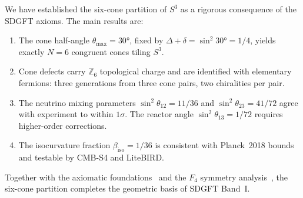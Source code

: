 \documentclass[amsmath,amssymb,aps,prd,twocolumn,superscriptaddress,nofootinbib]{revtex4-2}
\begin{document}
We have established the six-cone partition of $S^3$ as a rigorous consequence
of the SDGFT axioms.  The main results are:

\begin{enumerate}
  \item The cone half-angle $\theta_{\max} = 30°$, fixed by
    $\Delta + \delta = \sin^2 30° = 1/4$, yields exactly $N = 6$ congruent
    cones tiling $S^3$.

  \item Cone defects carry $\mathbb{Z}_6$ topological charge and are identified
    with elementary fermions: three generations from three cone pairs, two
    chiralities per pair.

  \item The neutrino mixing parameters $\sin^2\theta_{12} = 11/36$ and
    $\sin^2\theta_{23} = 41/72$ agree with experiment to within $1\sigma$.
    The reactor angle $\sin^2\theta_{13} = 1/72$ requires higher-order
    corrections.

  \item The isocurvature fraction $\beta_{\mathrm{iso}} = 1/36$ is consistent
    with Planck~2018 bounds and testable by CMB-S4 and LiteBIRD.
\end{enumerate}

Together with the axiomatic foundations~\cite{Besemer2026_01} and the
$F_4$ symmetry analysis~\cite{Besemer2026_02}, the six-cone partition
completes the geometric basis of SDGFT Band~I.
\end{document}
